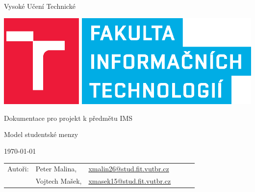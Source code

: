 \documentclass{article}
\begin{document}
\begin{titlepage}
 
	\begin{center}
		\begin{LARGE}
			Vysoké Učení Technické \\
			\vspace{0.7cm}
		\end{LARGE}
		\vspace{2cm}
        
		\includegraphics[scale=1]{FIT_zkracene_barevne_PANTONE_CZ.eps}

	\end{center}	
	
	\vfill
	\vspace{2cm}
	
	\begin{center}
		\begin{Large}
			Dokumentace pro projekt k předmětu IMS \\
		\end{Large}
		\bigskip
		\begin{Huge}
			 Model studentské menzy\\
		\end{Huge}
	\end{center}
 
	\vfill
 
	\begin{center}
		\begin{Large}
			\today
		\end{Large}
	\end{center}
 
	\vfill
 
	\begin{flushleft}
		\begin{large}
			\begin{tabular}{llllll}
				Autoři:
                	& Peter Malina, 	& \url{xmalin26@stud.fit.vutbr.cz} & & \\
                	& Vojtech Mašek,	& \url{xmasek15@stud.fit.vutbr.cz} & & \\
			\end{tabular}
		\end{large}
	\end{flushleft}
\end{titlepage}
\end{document}
